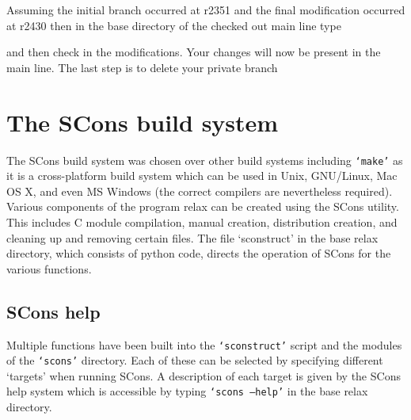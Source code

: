 
Assuming the initial branch occurred at r2351 and the final modification occurred at r2430 then in the base directory of the checked out main line type


and then check in the modifications.  Your changes will now be present in the main line.  The last step is to delete your private branch





\section{The SCons build system}

The SCons build system was chosen over other build systems including \texttt{`make'} as it is a cross-platform build system which can be used in Unix, GNU/Linux, Mac OS X, and even MS Windows (the correct compilers are nevertheless required).  Various components of the program relax can be created using the SCons utility.  This includes C module compilation, manual creation, distribution creation, and cleaning up and removing certain files.  The file `sconstruct' in the base relax directory, which consists of python code, directs the operation of SCons for the various functions.



\subsection{SCons help}

Multiple functions have been built into the \texttt{`sconstruct'} script and the modules of the \texttt{`scons'} directory.  Each of these can be selected by specifying different `targets' when running SCons.  A description of each target is given by the SCons help system which is accessible by typing \texttt{`scons --help'} in the base relax directory.



